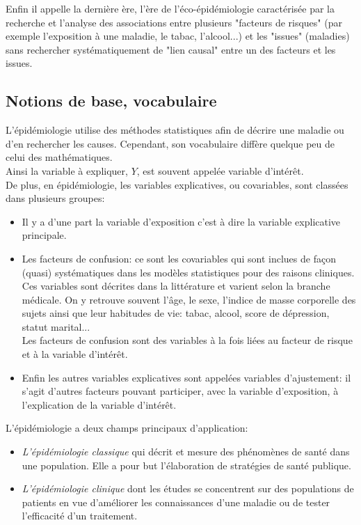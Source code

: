 \documentclass{book}
\begin{document}
\noindent
Enfin il appelle la dernière ère, l'ère de l'éco-épidémiologie caractérisée par la recherche et l'analyse des associations entre plusieurs "facteurs de risques" (par exemple l'exposition à une maladie, le tabac, l'alcool...) et les "issues" (maladies) sans rechercher systématiquement de "lien causal" entre un des facteurs et les issues.\\


\subsection{Notions de base, vocabulaire}

\noindent
L'épidémiologie utilise des méthodes statistiques afin de décrire une maladie ou d'en rechercher les causes. Cependant, son vocabulaire diffère quelque peu de celui des mathématiques.\\
Ainsi la variable à expliquer, $Y$, est souvent appelée variable d'intérêt. \\

\noindent
De plus, en épidémiologie, les variables explicatives, ou covariables, sont classées dans plusieurs groupes:

\begin{itemize}
\item Il y a d'une part la variable d'exposition c'est à dire la variable explicative principale. 
\item Les facteurs de confusion: ce sont les covariables qui sont inclues de façon (quasi) systématiques dans les modèles statistiques pour des raisons cliniques. Ces variables sont décrites dans la littérature et varient selon la branche médicale. On y retrouve souvent l'âge, le sexe, l'indice de masse corporelle des sujets ainsi que leur habitudes de vie: tabac, alcool, score de dépression, statut marital...\\
Les facteurs de confusion sont des variables à la fois liées au facteur de risque et à la variable d'intérêt.
\item Enfin les autres variables explicatives sont appelées variables d'ajustement: il s'agit d'autres facteurs pouvant participer, avec la variable d'exposition, à l'explication de la variable d'intérêt.
\end{itemize} 

\bigskip 

\noindent
L'épidémiologie a deux champs principaux d'application:
\begin{itemize}
\item \textit{L'épidémiologie classique} qui décrit et mesure des phénomènes de santé dans une population. Elle a pour but l'élaboration de stratégies de santé publique.
\item \textit{L'épidémiologie clinique} dont les études se concentrent sur des populations de patients en vue d'améliorer les connaissances d'une maladie ou de tester l'efficacité d'un traitement.
\end{itemize}
\end{document}
